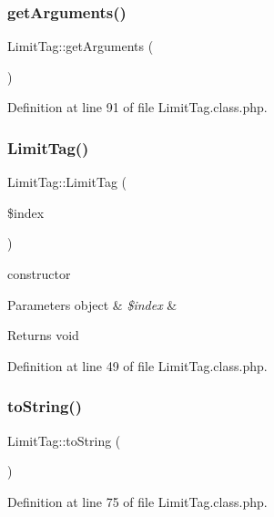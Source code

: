 \subsubsection{\texorpdfstring{get\+Arguments()}{getArguments()}}
{\footnotesize\ttfamily Limit\+Tag\+::get\+Arguments (\begin{DoxyParamCaption}{ }\end{DoxyParamCaption})}



Definition at line 91 of file Limit\+Tag.\+class.\+php.

\mbox{\label{classLimitTag_a9b5dbee572b93d0ae32089e8deed7462}} 
\subsubsection{\texorpdfstring{Limit\+Tag()}{LimitTag()}}
{\footnotesize\ttfamily Limit\+Tag\+::\+Limit\+Tag (\begin{DoxyParamCaption}\item[{}]{\$index }\end{DoxyParamCaption})}

constructor 
\begin{DoxyParams}[1]{Parameters}
object & {\em \$index} & \\
\hline
\end{DoxyParams}
\begin{DoxyReturn}{Returns}
void 
\end{DoxyReturn}


Definition at line 49 of file Limit\+Tag.\+class.\+php.

\mbox{\label{classLimitTag_ae557d296324baf6a0381b18361353e85}} 
\subsubsection{\texorpdfstring{to\+String()}{toString()}}
{\footnotesize\ttfamily Limit\+Tag\+::to\+String (\begin{DoxyParamCaption}{ }\end{DoxyParamCaption})}



Definition at line 75 of file Limit\+Tag.\+class.\+php.



